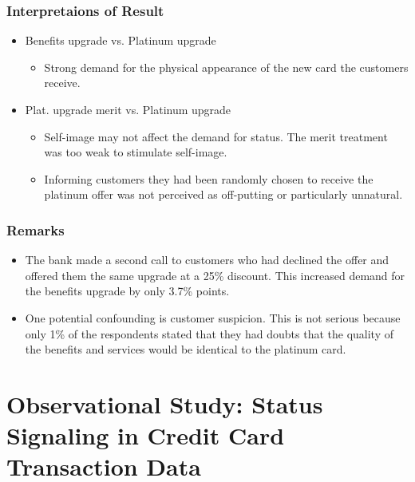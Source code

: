 \documentclass[unicode,12pt]{beamer}
\begin{document}
    \begin{frame}
        \frametitle{Interpretaions of Result}
    
        \begin{itemize}
            \item Benefits upgrade vs. Platinum upgrade
            \begin{itemize}
                \item Strong demand for the physical appearance of the new card the customers receive.
            \end{itemize}
            \item Plat. upgrade merit vs. Platinum upgrade
            \begin{itemize}
                \item Self-image may not affect the demand for status. The merit treatment was too weak to stimulate self-image.
                \item Informing customers they had been randomly chosen to receive the platinum offer was not perceived as off-putting or particularly unnatural.
            \end{itemize} 
        \end{itemize}
    
    \end{frame}

    \begin{frame}
        \frametitle{Remarks}
    
        \begin{itemize}
            \item The bank made a second call to customers who had declined the offer and offered them the same upgrade at a 25\% discount. This increased demand for the benefits upgrade by only 3.7\% points.
            \item One potential confounding is customer suspicion. This is not serious because only 1\% of the respondents stated that they had doubts that the quality of the benefits and services would be identical to the platinum card.
        \end{itemize}
        
    \end{frame}

    \section{Observational Study: Status Signaling in Credit Card Transaction Data}
\end{document}
